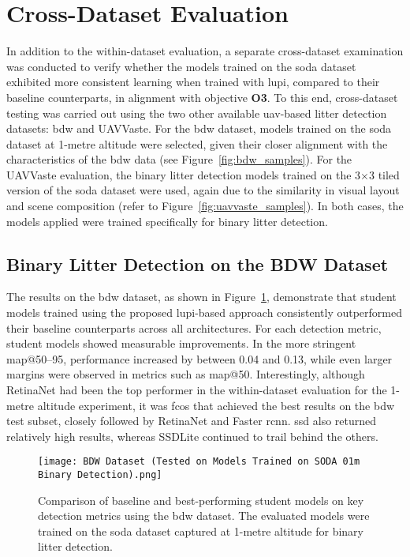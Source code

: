 \section{Cross-Dataset Evaluation}
\label{sec:5_cross_dataset_exp}

In addition to the within-dataset evaluation, a separate cross-dataset examination was conducted to verify whether the models trained on the \gls{soda} dataset exhibited more consistent learning when trained with \gls{lupi}, compared to their baseline counterparts, in alignment with objective \textbf{O3}. To this end, cross-dataset testing was carried out using the two other available \gls{uav}-based litter detection datasets: \gls{bdw} and UAVVaste. For the \gls{bdw} dataset, models trained on the \gls{soda} dataset at 1-metre altitude were selected, given their closer alignment with the characteristics of the \gls{bdw} data (see Figure~\ref{fig:bdw_samples}). For the UAVVaste evaluation, the binary litter detection models trained on the 3$\times$3 tiled version of the \gls{soda} dataset were used, again due to the similarity in visual layout and scene composition (refer to Figure~\ref{fig:uavvaste_samples}). In both cases, the models applied were trained specifically for binary litter detection.

\subsection{Binary Litter Detection on the BDW Dataset}
\label{subsec:5_bdw_exp}

The results on the \gls{bdw} dataset, as shown in Figure~\ref{fig:bdw_bar}, demonstrate that student models trained using the proposed \gls{lupi}-based approach consistently outperformed their baseline counterparts across all architectures. For each detection metric, student models showed measurable improvements. In the more stringent \gls{map}@50--95, performance increased by between 0.04 and 0.13, while even larger margins were observed in metrics such as \gls{map}@50. Interestingly, although RetinaNet had been the top performer in the within-dataset evaluation for the 1-metre altitude experiment, it was \gls{fcos} that achieved the best results on the \gls{bdw} test subset, closely followed by RetinaNet and Faster \gls{rcnn}. \gls{ssd} also returned relatively high results, whereas SSDLite continued to trail behind the others.

\begin{figure}[!ht]
    \centering
    \texttt{[image: BDW Dataset (Tested on Models Trained on SODA 01m Binary Detection).png]}
    \caption{Comparison of baseline and best-performing student models on key detection metrics using the \gls{bdw} dataset. The evaluated models were trained on the \gls{soda} dataset captured at 1-metre altitude for binary litter detection.}
    \label{fig:bdw_bar}
\end{figure}

